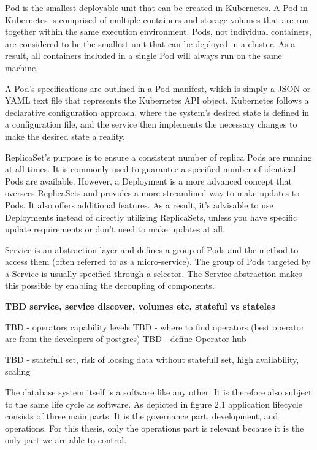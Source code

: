 Pod is the smallest deployable unit that can be created in Kubernetes. \cite{docuKubePods} A Pod in Kubernetes is comprised of multiple containers and storage volumes that are run together within the same execution environment. Pods, not individual containers, are considered to be the smallest unit that can be deployed in a cluster. As a result, all containers included in a single Pod will always run on the same machine. \cite{kubeUpAndRunningPods}

A Pod's specifications are outlined in a Pod manifest, which is simply a JSON or YAML text file that represents the Kubernetes API object. Kubernetes follows a declarative configuration approach, where the system's desired state is defined in a configuration file, and the service then implements the necessary changes to make the desired state a reality. \cite{docuKubeStaticPod}

ReplicaSet’s purpose is to ensure a consistent number of replica Pods are running at all times. It is commonly used to guarantee a specified number of identical Pods are available. However, a Deployment is a more advanced concept that oversees ReplicaSets and provides a more streamlined way to make updates to Pods. It also offers additional features. As a result, it's advisable to use Deployments instead of directly utilizing ReplicaSets, unless you have specific update requirements or don't need to make updates at all. \cite{docuKubeReplicaset}

Service is an abstraction layer and defines a group of Pods and the method to access them (often referred to as a micro-service). The group of Pods targeted by a Service is usually specified through a selector. The Service abstraction makes this possible by enabling the decoupling of components. \cite{docuKubeSevice}

\textbf{TBD service, service discover, volumes etc, stateful vs stateles}

TBD - operators capability levels
TBD - where to find operators (best operator are from the developers of postgres)
TBD - define Operator hub

TBD - statefull set, risk of loosing data without statefull set, high availability, scaling


The database system itself is a software like any other. It is therefore also subject to the same life cycle as software.
As depicted in figure 2.1 application lifecycle consists of three main parts. It is the governance part, development, and operations. For this thesis, only the operations part is relevant because it is the only part we are able to control.

